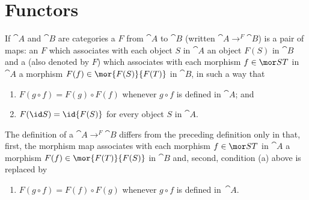 \section{Functors}
\begin{defn} If $\cat{A}$ and $\cat{B}$ are categories a
 $F$ from $\cat A$ to $\cat B$ (written ${\cat A}\to^F{\cat B}$) is
a pair of maps: an
 $F$ which associates with each object $S$ in $\cat A$ an object $F(S)$ in
$\cat B$ and a
 (also denoted by $F$) which associates with each morphism $f \in \mor
ST$ in $\cat A$ a morphism $F(f) \in \mor {F(S)}{F(T)}$ in $\cat B$, in such a way that
 \begin{enumerate}
  \item $F(g \circ f) = F(g) \circ F(f)$ whenever $g \circ f$ is defined in $\cat A$; and
  \item $F(\id S) = \id{F(S)}$ for every object $S$ in $\cat A$.
 \end{enumerate}

The definition of a
 ${\cat A}\to^F{\cat B}$ differs from the preceding definition
only in that, first, the morphism map associates with each morphism $f \in \mor ST$ in
$\cat A$ a morphism $F(f) \in \mor {F(T)}{F(S)}$ in $\cat B$ and, second, condition (a)
above is replaced by
 \begin{enumerate}
  \item[(\rm{a'})] $F(g \circ f) = F(f) \circ F(g)$ whenever $g \circ f$
is defined in~$\cat A$.
 \end{enumerate}
\end{defn}

